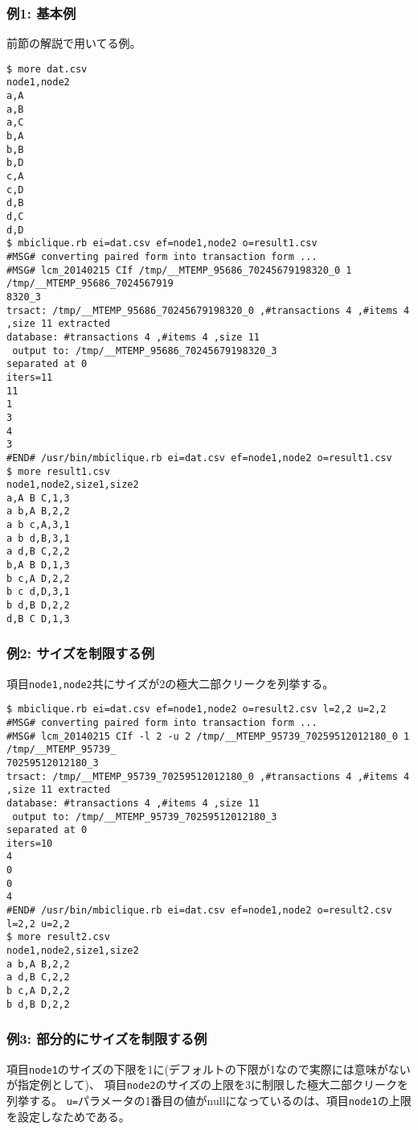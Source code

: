 \subsubsection*{例1: 基本例}

前節の解説で用いてる例。


\begin{Verbatim}[baselinestretch=0.7,frame=single]
$ more dat.csv
node1,node2
a,A
a,B
a,C
b,A
b,B
b,D
c,A
c,D
d,B
d,C
d,D
$ mbiclique.rb ei=dat.csv ef=node1,node2 o=result1.csv
#MSG# converting paired form into transaction form ...
#MSG# lcm_20140215 CIf /tmp/__MTEMP_95686_70245679198320_0 1 /tmp/__MTEMP_95686_7024567919
8320_3
trsact: /tmp/__MTEMP_95686_70245679198320_0 ,#transactions 4 ,#items 4 ,size 11 extracted 
database: #transactions 4 ,#items 4 ,size 11
 output to: /tmp/__MTEMP_95686_70245679198320_3
separated at 0
iters=11
11
1
3
4
3
#END# /usr/bin/mbiclique.rb ei=dat.csv ef=node1,node2 o=result1.csv
$ more result1.csv
node1,node2,size1,size2
a,A B C,1,3
a b,A B,2,2
a b c,A,3,1
a b d,B,3,1
a d,B C,2,2
b,A B D,1,3
b c,A D,2,2
b c d,D,3,1
b d,B D,2,2
d,B C D,1,3
\end{Verbatim}
\subsubsection*{例2: サイズを制限する例}

項目\verb|node1,node2|共にサイズが2の極大二部クリークを列挙する。


\begin{Verbatim}[baselinestretch=0.7,frame=single]
$ mbiclique.rb ei=dat.csv ef=node1,node2 o=result2.csv l=2,2 u=2,2
#MSG# converting paired form into transaction form ...
#MSG# lcm_20140215 CIf -l 2 -u 2 /tmp/__MTEMP_95739_70259512012180_0 1 /tmp/__MTEMP_95739_
70259512012180_3
trsact: /tmp/__MTEMP_95739_70259512012180_0 ,#transactions 4 ,#items 4 ,size 11 extracted 
database: #transactions 4 ,#items 4 ,size 11
 output to: /tmp/__MTEMP_95739_70259512012180_3
separated at 0
iters=10
4
0
0
4
#END# /usr/bin/mbiclique.rb ei=dat.csv ef=node1,node2 o=result2.csv l=2,2 u=2,2
$ more result2.csv
node1,node2,size1,size2
a b,A B,2,2
a d,B C,2,2
b c,A D,2,2
b d,B D,2,2
\end{Verbatim}
\subsubsection*{例3: 部分的にサイズを制限する例}

項目\verb|node1|のサイズの下限を1に(デフォルトの下限が1なので実際には意味がないが指定例として)、
項目\verb|node2|のサイズの上限を3に制限した極大二部クリークを列挙する。
\verb|u=|パラメータの1番目の値がnullになっているのは、項目\verb|node1|の上限を設定しなためである。



